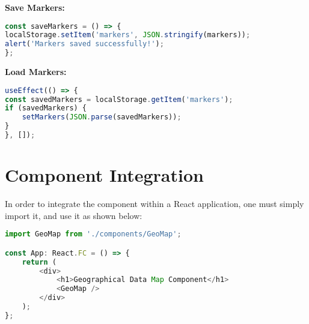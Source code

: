 \documentclass[11pt]{article}
\begin{document}
    \textbf{Save Markers:}
    \begin{lstlisting}[language=javascript]
const saveMarkers = () => {
localStorage.setItem('markers', JSON.stringify(markers));
alert('Markers saved successfully!');
};
    \end{lstlisting}

    \textbf{Load Markers:}
    \begin{lstlisting}[language=javascript]
useEffect(() => {
const savedMarkers = localStorage.getItem('markers');
if (savedMarkers) {
    setMarkers(JSON.parse(savedMarkers));
}
}, []);
    \end{lstlisting}

    \section{Component Integration}

    In order to integrate the component within a React application, one must simply import it, and use it as shown below:

    \begin{lstlisting}[language=javascript]
import GeoMap from './components/GeoMap';

const App: React.FC = () => {
    return (
        <div>
            <h1>Geographical Data Map Component</h1>
            <GeoMap />
        </div>
    );
};
    \end{lstlisting}
\end{document}
